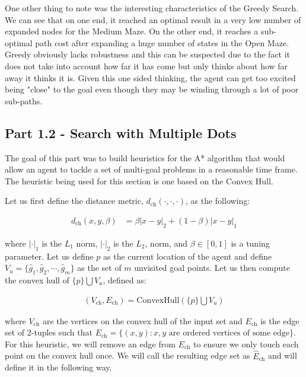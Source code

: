 \documentclass{article}[12pt]
\begin{document}
   One other thing to note was the interesting characteristics of the Greedy Search. We can see that on one end, it reached an optimal result in a very low number of expanded nodes for the Medium Maze. On the other end, it reaches a sub-optimal path cost after expanding a huge number of states in the Open Maze. Greedy obviously lacks robustness and this can be suspected due to the fact it does not take into account how far it has come but only thinks about how far away it thinks it is. Given this one sided thinking, the agent can get too excited being "close" to the goal even though they may be winding through a lot of poor sub-paths.
   
    
   
    \newpage
   \subsection{Part 1.2 - Search with Multiple Dots}
The goal of this part was to build heuristics for the A* algorithm that would allow an agent to tackle a set of multi-goal problems in a reasonable time frame. The heuristic being used for this section is one based on the Convex Hull. 

Let us first define the distance metric, $d_{\text{ch}}(\cdot,\cdot,\cdot)$, as the following:

\begin{align*}
d_{\text{ch}}(x,y, \beta) &= \beta |x-y|_2+ \left(1-\beta\right) |x-y|_1 
\end{align*}

where $|\cdot|_1$ is the $L_1$ norm, $|\cdot|_2$ is the $L_2$, norm, and $\beta \in [0,1]$ is a tuning parameter. Let us define $p$ as the current location of the agent and define $V_u = \lbrace \hat{g}_1, \hat{g}_2, \cdots, \hat{g}_m \rbrace$ as the set of $m$ unvisited goal points. Let us then compute the convex hull of $\lbrace p \rbrace \bigcup V_u$, defined as:

\begin{align*}
\left(V_{\text{ch}}, E_{\text{ch}} \right) = \text{ConvexHull}\left(\lbrace p \rbrace \bigcup V_u \right)
\end{align*}

where $V_{\text{ch}}$ are the vertices on the convex hull of the input set and $E_{\text{ch}}$ is the edge set of 2-tuples such that $E_{\text{ch}} = \lbrace (x,y): x,y \text{ are ordered vertices of some edge} \rbrace$. For this heuristic, we will remove an edge from $E_{\text{ch}}$ to ensure we only touch each point on the convex hull once. We will call the resulting edge set as $\hat{E}_{\text{ch}}$ and will define it in the following way. 
\end{document}
